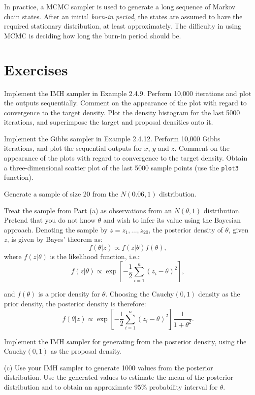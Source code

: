 In practice, a MCMC sampler is used to generate a long sequence of Markov chain states. After an initial {\it burn-in period}, the states are assumed to have the required stationary distribution, at least approximately. The difficulty in using MCMC is deciding how long the burn-in period should be.



\section{Exercises}

\begin{exercise}
Implement the IMH sampler in Example 2.4.9. Perform 10,000 iterations and plot the outputs sequentially. Comment on the appearance of the plot with regard to convergence to the target density. Plot the density histogram for the last 5000 iterations, and superimpose the target and proposal densities onto it.
\end{exercise}

\begin{exercise}
Implement the Gibbs sampler in Example 2.4.12. Perform 10,000 Gibbs iterations, and plot the sequential outputs for $x$, $y$ and $z$. Comment on the appearance of the plots with regard to convergence to the target density. Obtain a three-dimensional scatter plot of the last 5000 sample points (use the {\tt plot3} function).
\end{exercise}

\begin{exercise}
\begin{asparaenum}[(a)]
\item Generate a sample of size 20 from the $N(0.06, 1)$ distribution.

\item	Treat the sample from Part (a) as observations from an $N(\theta, 1)$ distribution. Pretend that you do not know $\theta$ and wish to infer its value using the Bayesian approach. Denoting the sample by $z={z_1,\ldots,z_{20}}$, the posterior density of $\theta$, given $z$, is given by Bayes' theorem as:
$$f(\theta|z)\propto f(z|\theta)f(\theta),$$
where $f(z|\theta)$ is the likelihood function, i.e.:
$$f(z|\theta)\propto \exp[ -\frac{1}{2} \sum^n_{i=1} (z_i-\theta)^2 ],$$

and $f(\theta)$ is a prior density for $\theta$. Choosing the Cauchy$(0,1)$ density as the prior density, the posterior density is therefore:
$$f(\theta|z)\propto \exp [-\frac{1}{2}\sum^n_{i=1}(z_i-\theta)^2] \frac{1}{1+\theta^2}.$$

Implement the IMH sampler for generating from the posterior density, using the Cauchy$(0,1)$ as the proposal density.

(c)	Use your IMH sampler to generate 1000 values from the posterior distribution. Use the generated values to estimate the mean of the posterior distribution and to obtain an approximate 95\% probability interval for $\theta$.
\end{asparaenum}
\end{exercise}

